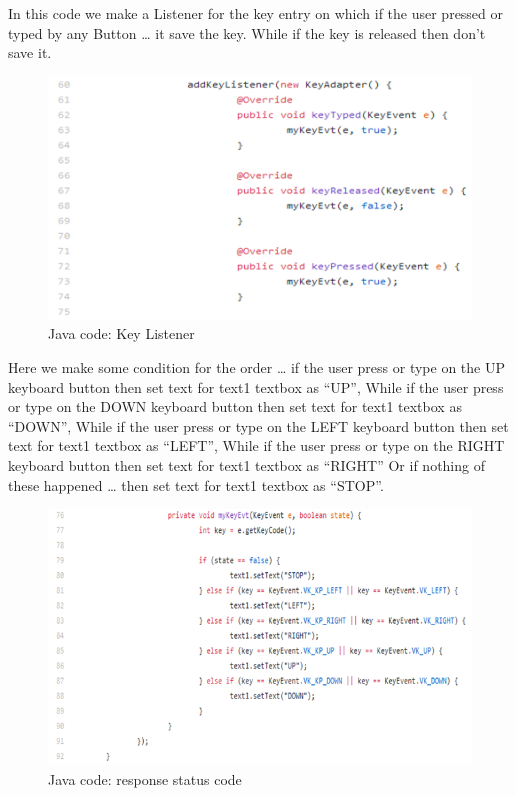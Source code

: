 \documentclass{article}
\begin{document}
In this code we make a Listener for the key entry on which if the user pressed or typed by any Button … it save the key. While if the key is released then don’t save it.

\begin{figure}[h]
    \centering
    \includegraphics{figures/47.png}
    \caption{Java code: Key Listener}
    \label{fig:my_label}
\end{figure}

\newpage
Here we make some condition for the order … if the user press or type on the UP keyboard button then set text for text1 textbox as “UP”, While if the user press or type on the DOWN keyboard button then set text for text1 textbox as “DOWN”, While if the user press or type on the LEFT keyboard button then set text for text1 textbox as “LEFT”, While if the user press or type on the RIGHT keyboard button then set text for text1 textbox as “RIGHT” Or if nothing of these happened … then set text for text1 textbox as “STOP”.

\begin{figure}[h]
    \centering
    \includegraphics[width=.9\textwidth]{figures/48.png}
    \caption{Java code: response status code}
    \label{fig:my_label}
\end{figure}
\end{document}
